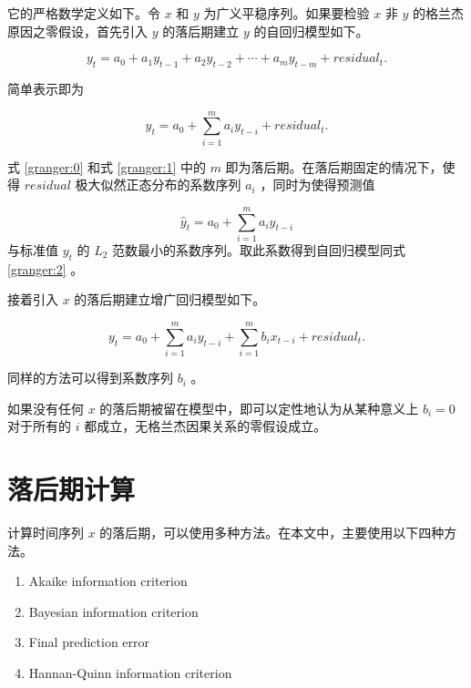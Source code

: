 它的严格数学定义如下。令 $x$ 和 $y$ 为广义平稳序列。如果要检验 $x$ 非 $y$ 的格兰杰原因之零假设，首先引入 $y$ 的落后期建立 $y$ 的自回归模型如下。

\begin{equation}
  \label{granger:0}
  y_{t}=a_{0}+a_{1}y_{t-1}+a_{2}y_{t-2}+\cdots+a_{m}y_{t-m}+residual_{t}.
\end{equation}

简单表示即为

\begin{equation}
  \label{granger:1}
  y_{t}=a_{0}+\sum_{i=1}^{m}a_{i}y_{t-i}+residual_{t}.
\end{equation}

式 \ref{granger:0} 和式 \ref{granger:1} 中的 $m$ 即为落后期。在落后期固定的情况下，使得 $residual$ 极大似然正态分布的系数序列 $a_{i}$ ，同时为使得预测值

\begin{equation}
  \label{granger:2}
  \hat{y}_{t}=a_{0}+\sum_{i=1}^{m}a_{i}y_{t-i}
\end{equation}
与标准值 $y_{t}$ 的 $L_{2}$ 范数最小的系数序列。取此系数得到自回归模型同式 \ref{granger:2} 。

接着引入 $x$ 的落后期建立增广回归模型如下。

\begin{equation}
  \label{granger:3}
  y_{t}=a_{0}+\sum_{i=1}^{m}a_{i}y_{t-i}+\sum_{i=1}^{m}b_{i}x_{t-i}+residual_{t}.
\end{equation}

同样的方法可以得到系数序列 $b_{i}$ 。

如果没有任何 $x$ 的落后期被留在模型中，即可以定性地认为从某种意义上 $b_{i}=0$
对于所有的 ${i}$ 都成立，无格兰杰因果关系的零假设成立。

\section{落后期计算}

计算时间序列 $x$ 的落后期，可以使用多种方法。在本文中，主要使用以下四种方法。

\begin{enumerate}
  \item Akaike information criterion
  \item Bayesian information criterion
  \item Final prediction error
  \item Hannan-Quinn information criterion
\end{enumerate}

